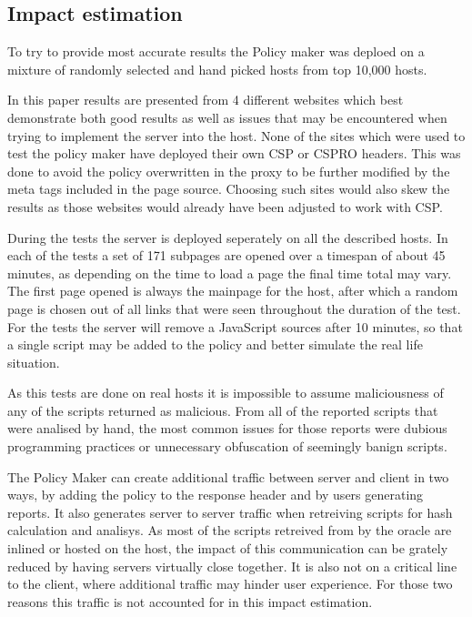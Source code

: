 \begin{description}

\subsection{Impact estimation}

To try to provide most accurate results the Policy maker was deploed on a mixture of randomly selected and hand picked hosts from top 10,000 hosts.

In this paper results are presented from 4 different websites which best demonstrate both good results as well as issues that may be encountered when trying to implement the server into the host.
None of the sites which were used to test the policy maker have deployed their own CSP or CSPRO headers.
This was done to avoid the policy overwritten in the proxy to be further modified by the meta tags included in the page source.
Choosing such sites would also skew the results as those websites would already have been adjusted to work with CSP.

During the tests the server is deployed seperately on all the described hosts.
In each of the tests a set of 171 subpages are opened over a timespan of about 45 minutes, as depending on the time to load a page the final time total may vary. 
The first page opened is always the mainpage for the host, after which a random page is chosen out of all links that were seen throughout the duration of the test.
For the tests the server will remove a JavaScript sources after 10 minutes, so that a single script may be added to the policy and better simulate the real life situation.

As this tests are done on real hosts it is impossible to assume maliciousness of any of the scripts returned as malicious.
From all of the reported scripts that were analised by hand, the most common issues for those reports were dubious programming practices or unnecessary obfuscation of seemingly banign scripts.

The Policy Maker can create additional traffic between server and client in two ways, by adding the policy to the response header and by users generating reports.
It also generates server to server traffic when retreiving scripts for hash calculation and analisys.
As most of the scripts retreived from by the oracle are inlined or hosted on the host, the impact of this communication can be grately reduced by having servers virtually close together.
It is also not on a critical line to the client, where additional traffic may hinder user experience.
For those two reasons this traffic is not accounted for in this impact estimation.


\end{description}
